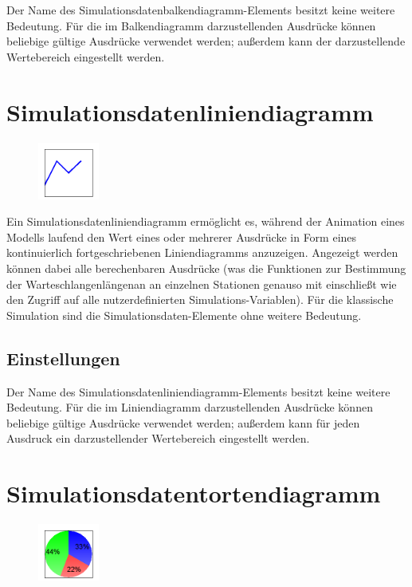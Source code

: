 Der Name des Simulationsdatenbalkendiagramm-Elements besitzt keine weitere Bedeutung. Für die im
Balkendiagramm darzustellenden Ausdrücke können beliebige gültige Ausdrücke verwendet werden;
außerdem kann der darzustellende Wertebereich eingestellt werden.


\section{Simulationsdatenliniendiagramm}
\label{ref:ModelElementAnimationDiagram}

\begin{figure}
\vspace{-22pt}
\includegraphics[width=2cm]{imageModelElementAnimationDiagram.png}
\vspace{-22pt}
\end{figure}

Ein Simulationsdatenliniendiagramm ermöglicht es, während der Animation eines Modells laufend den Wert
eines oder mehrerer Ausdrücke in Form eines kontinuierlich fortgeschriebenen Liniendiagramms anzuzeigen.
Angezeigt werden können dabei alle berechenbaren Ausdrücke (was die Funktionen zur Bestimmung der
Warteschlangenlängenan an einzelnen Stationen genauso mit einschließt wie den Zugriff auf alle
nutzerdefinierten Simulations-Variablen). Für die klassische Simulation sind die
Simulationsdaten-Elemente ohne weitere Bedeutung.

\subsection*{Einstellungen}

Der Name des Simulationsdatenliniendiagramm-Elements besitzt keine weitere Bedeutung. Für die im
Liniendiagramm darzustellenden Ausdrücke können beliebige gültige Ausdrücke verwendet werden;
außerdem kann für jeden Ausdruck ein darzustellender Wertebereich eingestellt werden.


\section{Simulationsdatentortendiagramm}
\label{ref:ModelElementAnimationPieChart}

\begin{figure}
\vspace{-22pt}
\includegraphics[width=2cm]{imageModelElementAnimationPieChart.png}
\vspace{-22pt}
\end{figure}

